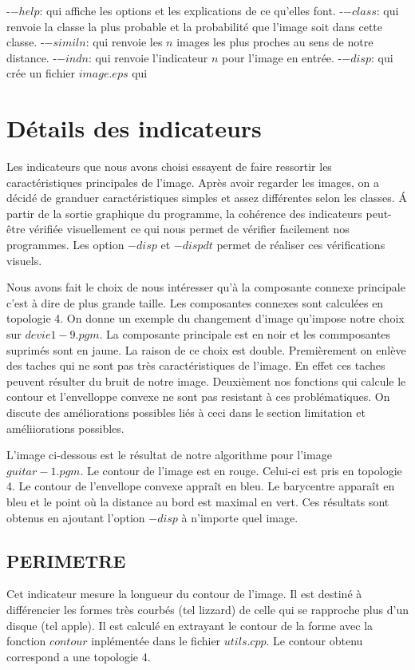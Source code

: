 \documentclass{report}
\begin{document}
\noindent-$-help$: qui affiche les options et les explications de ce qu'elles font.
\noindent-$-class$: qui renvoie la classe la plus probable et la probabilité que l'image soit dans cette classe.
\noindent-$-simil n$: qui renvoie les $n$ images les plus proches au sens de notre distance.
\noindent-$-indn$: qui renvoie l'indicateur $n$ pour l'image en entrée.
\noindent-$-disp$: qui crée un fichier $image.eps$ qui 


\chapter{Détails des indicateurs}
Les indicateurs que nous avons choisi essayent de faire ressortir les caractéristiques principales de l'image.
Après avoir regarder les images, on a décidé de granduer caractéristiques simples et assez différentes selon les classes.
\'A partir de la sortie graphique du programme, la cohérence des indicateurs peut-être vérifiée visuellement ce 
qui nous permet de vérifier facilement nos programmes. Les option $-disp$ et $-dispdt$ permet de réaliser ces vérifications
visuels.

Nous avons fait le choix de nous intéresser qu'à la composante connexe principale c'est à dire de plus grande taille.
Les composantes connexes sont calculées en topologie 4.
On donne un exemple du changement d'image qu'impose notre choix sur $devie1-9.pgm$.
La composante principale est en noir et les commposantes suprimés sont en jaune.
La raison de ce choix est double.
Premièrement on enlève des taches qui ne sont pas très caractéristiques de l'image. 
En effet ces taches peuvent résulter du bruit de notre image.
Deuxièment nos fonctions qui calcule le contour et l'envelloppe convexe ne sont pas resistant à ces problématiques.
On discute des améliorations possibles liés à ceci dans le section limitation et améliiorations possibles.


L'image ci-dessous est le résultat de notre algorithme pour l'image $guitar-1.pgm$.
Le contour de l'image est en rouge. Celui-ci est pris en topologie 4. 
Le contour de l'envellope convexe appraît en bleu. Le barycentre apparaît en bleu et le point
où la distance au bord est maximal en vert.
Ces résultats sont obtenus en ajoutant l'option $-disp$ à n'importe quel image. 
\section{PERIMETRE} Cet indicateur mesure la longueur du contour de l'image. Il est destiné à différencier les formes très courbés (tel lizzard) de celle qui se rapproche plus d'un disque (tel apple). Il est calculé en extrayant le contour de la forme avec la fonction $contour$ inplémentée dans le fichier $utils.cpp$. Le contour obtenu correspond a une topologie 4.
\end{document}

